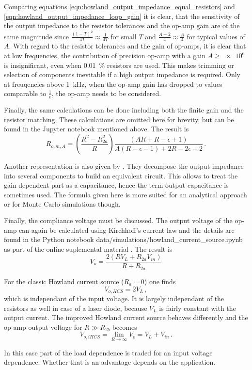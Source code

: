 \documentclass[12pt]{book}
\providecommand{\external}[1]{\textsf{#1}}
\begin{document}
Comparing equations \ref{eqn:howland_output_impedance_equal_resistors} and \ref{eqn:howland_output_impedance_loop_gain} it is clear, that the sensitivity of the output impedance to the resistor tolerances and the op-amp gain are of the same magnitude since $\frac{(1-T)^2}{4 T} \approx \frac{1}{4T}$ for small $T$ and $\frac{A+2}{4} \approx \frac A 4$ for typical values of $A$. With regard to the resistor tolerances and the gain of op-amps, it is clear that at low frequencies, the contribution of precision op-amp with a gain $A \geq \num{e6}$ is insignificant, even when \qty{0.01}{\percent} resistors are used. This makes trimming or selection of components inevitable if a high output impedance is required. Only at freuqencies above \qty{1}{\kHz}, when the op-amp gain has dropped to values comparable to $\frac{1}{\epsilon}$, the op-amp needs to be considered.

Finally, the same calculations can be done including both the finite gain and the resistor matching. These calculations are omitted here for brevity, but can be found in the Jupyter notebook mentioned above. The result is
\begin{equation}
    R_{o,m,A} = \left(\frac{R^2 - R_{2a}^2}{R}\right) \frac{\left(A R + R - \epsilon + 1\right)}{A \left(R + \epsilon - 1\right) + 2 R - 2 \epsilon + 2}\,.\label{eqn:appendix_howland_output_impedance_resistors_gain}
\end{equation}

Another representation is also given by \citeauthor{howland_comprehensive} \cite{howland_comprehensive}. They decompose the output impedance into several components to build an equivalent circuit. This allows to treat the gain dependent part as a capacitance, hence the term output capacitance is sometimes used. The formula given here is more suited for an analytical approach or for Monte Carlo simulations though.

Finally, the compliance voltage must be discussed. The output voltage of the op-amp can again be calculated using Kirchhoff's current law and the details are found in the Python notebook \external{data/simulations/howland\_current\_source.ipynb} as part of the online suplemental material \cite{supplemental_material}. The result is
\begin{equation}
    V_o = \frac{2 \left(R V_L + R_{2a} V_{in}\right)}{R + R_{2a}}
\end{equation}

For the classic Howland current source ($R_a = 0$) one finds
\begin{equation}
    V_{o,HCS} = 2 V_L\,,\label{eqn:howland_current_compliance_voltage}
\end{equation}
which is independant of the input voltage. It is largely independant of the resistors as well in case of a laser diode, because $V_L$ is fairly constant with the output current. The improved Howland current source behaves differently and the op-amp output voltage for $R \gg R_{2b}$ becomes
\begin{equation}
    V_{o,iHCS} = \lim_{R \to \infty} V_o = V_L + V_{in}\,.\label{eqn:improved_howland_current_compliance_voltage}
\end{equation}

In this case part of the load dependence is traded for an input voltage dependence. Whether that is an advantage depends on the application.
\end{document}
